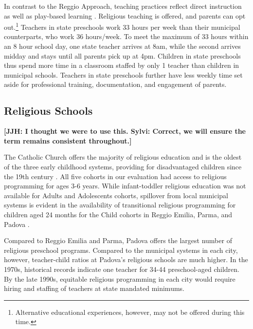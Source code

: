 In contrast to the Reggio Approach, teaching practices reflect direct instruction as well as play-based learning \citep{CEHD_2016_Historical-Analysis}. Religious teaching is offered, and parents can opt out.\footnote{Alternative educational experiences, however, may not be offered during this time.} Teachers in state preschools work 33 hours per week than their municipal counterparts, who work 36 hours/week. To meet the maximum of 33 hours within an 8 hour school day, one state teacher arrives at 8am, while the second arrives midday and stays until all parents pick up at 4pm. Children in state preschools thus spend more time in a classroom staffed by only 1 teacher than children in municipal schools. Teachers in state preschools further have less weekly time set aside for professional training, documentation, and engagement of parents.

\subsection{Religious Schools}

\textbf{[JJH: I thought we were to use this. Sylvi: Correct, we will ensure the term remains consistent throughout.]}

The Catholic Church offers the majority of religious education and is the oldest of the three early childhood systems, providing for disadvantaged children since the 19th century \citep{OECD_2001_Italy-Country-Note}. All five cohorts in our evaluation had access to religious programming for ages 3-6 years. While infant-toddler religious education was not available for Adults and Adolescents cohorts, spillover from local municipal systems is evident in the availability of transitional religious programming for children aged 24 months for the Child cohorts in Reggio Emilia, Parma, and Padova \citep{Malizia-Cicatelli_2011_BOOK_Catholic-School}. 

Compared to Reggio Emilia and Parma, Padova offers the largest number of religious preschool programs. Compared to the municipal systems in each city, however, teacher-child ratios at Padova's religious schools are much higher. In the 1970s, historical records indicate one teacher for 34-44 preschool-aged children. By the late 1990s, equitable religious programming in each city would require hiring and staffing of teachers at state mandated minimums.

